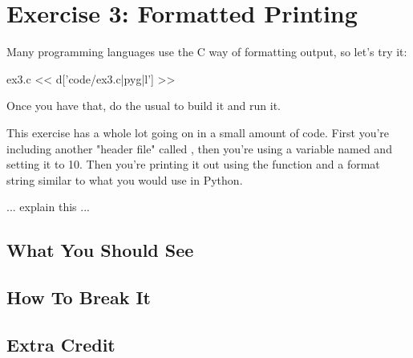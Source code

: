 \chapter{Exercise 3: Formatted Printing}

Many programming languages use the C way of formatting output, so let's try it:

\begin{code}{ex3.c}
<< d['code/ex3.c|pyg|l'] >>
\end{code}

Once you have that, do the usual  to build it and run it.

This exercise has a whole lot going on in a small amount of code.  First you're
including another "header file" called , then you're using a variable 
named  and setting it to 10.  Then you're printing it out using the
function  and a format string similar to what you would use
in Python.

... explain this ...

\section{What You Should See}


\section{How To Break It}


\section{Extra Credit}



